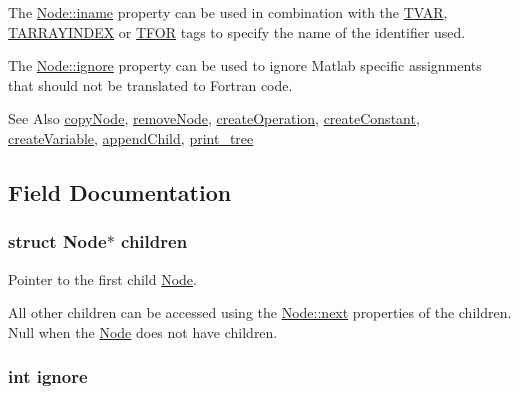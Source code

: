 The \hyperlink{structNode_a76c70ae7ac3d58ebe41da968fedb8093}{Node\-::iname} property can be used in combination with the \hyperlink{node_8h_a83ba1e84fa23f6619c3d29036b160919afe64957b6fe1c660804c3d310000b5f0}{T\-V\-A\-R}, \hyperlink{node_8h_a83ba1e84fa23f6619c3d29036b160919a5b179cf7f0b8747fa3f686c8d7cdc2aa}{T\-A\-R\-R\-A\-Y\-I\-N\-D\-E\-X} or \hyperlink{node_8h_a83ba1e84fa23f6619c3d29036b160919aae1cac6fabc93853164889cdc0d77b1a}{T\-F\-O\-R} tags to specify the name of the identifier used.

The \hyperlink{structNode_a28a2a20ee60bdfbd168e4f4bf20d8c82}{Node\-::ignore} property can be used to ignore Matlab specific assignments that should not be translated to Fortran code.

\begin{DoxySeeAlso}{See Also}
\hyperlink{node_8h_a630e9a32f8dad634171441534eedd274}{copy\-Node}, \hyperlink{node_8h_a9404ea17c515d0d18c37bde7c31b5979}{remove\-Node}, \hyperlink{node_8h_a990974952aa48d789ee7dabf10070194}{create\-Operation}, \hyperlink{node_8h_aa603e9647cbbe4208a6de5546df7b9f7}{create\-Constant}, \hyperlink{node_8h_a25b6be3754d0bfe7f721c65986872f75}{create\-Variable}, \hyperlink{node_8h_ac59e12e2146890bd3656810716854c5f}{append\-Child}, \hyperlink{tree_8h_a4035da3929ae669ab801f4eff738bb6e}{print\-\_\-tree} 
\end{DoxySeeAlso}


\subsection{Field Documentation}
\hypertarget{structNode_a827ac726d02ddf6d00ba8a55cd296df2}{
\subsubsection[{children}]{\setlength{\rightskip}{0pt plus 5cm}struct {\bf Node}$\ast$ children}}\label{structNode_a827ac726d02ddf6d00ba8a55cd296df2}


Pointer to the first child \hyperlink{structNode}{Node}. 

All other children can be accessed using the \hyperlink{structNode_aa162dd1e0693188a22b1f13b9a2a0ef0}{Node\-::next} properties of the children. Null when the \hyperlink{structNode}{Node} does not have children. \hypertarget{structNode_a28a2a20ee60bdfbd168e4f4bf20d8c82}{
\subsubsection[{ignore}]{\setlength{\rightskip}{0pt plus 5cm}int ignore}}\label{structNode_a28a2a20ee60bdfbd168e4f4bf20d8c82}


